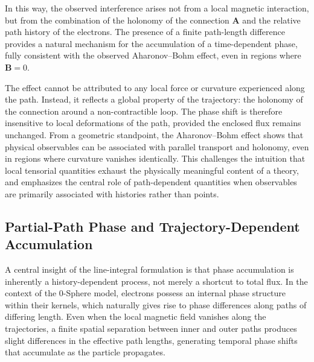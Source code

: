 \documentclass[%
 reprint,
 amsmath,amssymb,
 aps,
 prb,
]{revtex4-2}
\numberwithin{equation}{section}
\begin{document}
%
%

In this way, the observed interference arises not from a local magnetic interaction, but from the combination of the holonomy of the connection \( \mathbf{A} \) and the relative path history of the electrons. The presence of a finite path-length difference provides a natural mechanism for the accumulation of a time-dependent phase, fully consistent with the observed Aharonov--Bohm effect, even in regions where \( \mathbf{B} = 0 \).


The effect cannot be attributed to any local force or curvature experienced along the path. Instead, it reflects a global property of the trajectory: the holonomy of the connection around a non-contractible loop. The phase shift is therefore insensitive to local deformations of the path, provided the enclosed flux remains unchanged. From a geometric standpoint, the Aharonov--Bohm effect shows that physical observables can be associated with parallel transport and holonomy, even in regions where curvature vanishes identically. This challenges the intuition that local tensorial quantities exhaust the physically meaningful content of a theory, and emphasizes the central role of path-dependent quantities when observables are primarily associated with histories rather than points.


\subsection{Partial-Path Phase and Trajectory-Dependent Accumulation}
\label{sec:ab_partial_path_phase}

A central insight of the line-integral formulation is that phase accumulation is inherently a history-dependent process, not merely a shortcut to total flux. In the context of the 0-Sphere model, electrons possess an internal phase structure within their kernels, which naturally gives rise to phase differences along paths of differing length. Even when the local magnetic field vanishes along the trajectories, a finite spatial separation between inner and outer paths produces slight differences in the effective path lengths, generating temporal phase shifts that accumulate as the particle propagates.
\end{document}
